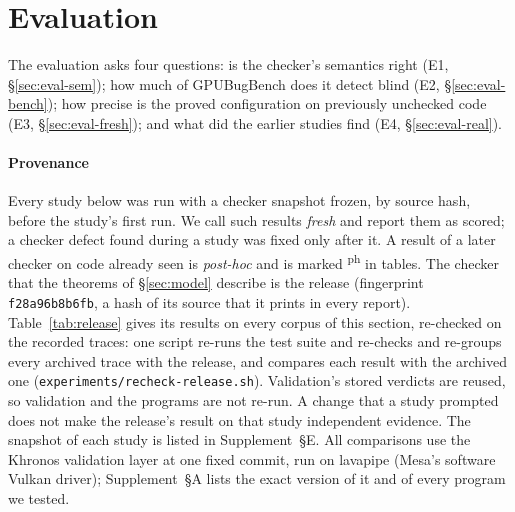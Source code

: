 \documentclass[acmtog,anonymous,review]{acmart}
\newcommand{\bench}{GPUBugBench\xspace}
\newcommand{\code}[1]{\texttt{#1}}
\newcommand{\supp}[1]{Supplement~\S#1}
\newcommand{\posthoc}{\textsuperscript{\textsf{ph}}}
\newcommand{\relhash}{\code{f28a96b8b6fb}}
\begin{document}
\section{Evaluation}
\label{sec:eval}

The evaluation asks four questions: is the checker's semantics right (E1, \S\ref{sec:eval-sem}); how much of \bench
does it detect blind (E2, \S\ref{sec:eval-bench}); how precise is the proved configuration on previously unchecked code
(E3, \S\ref{sec:eval-fresh}); and what did the earlier studies find (E4, \S\ref{sec:eval-real}).

\paragraph{Provenance}
Every study below was run with a checker snapshot frozen, by source hash, before the study's first run. We call such
results \emph{fresh} and report them as scored; a checker defect found during a study was fixed only after it. A result
of a later checker on code already seen is \emph{post-hoc} and is marked \posthoc{} in tables. The checker that the
theorems of \S\ref{sec:model} describe is the release (fingerprint \relhash, a hash of its source that it prints in every report). Table~\ref{tab:release}
gives its results on every corpus of this section, re-checked on the recorded traces: one script re-runs the test
suite and re-checks and re-groups every archived trace with the release, and compares each result with the archived
one (\code{experiments/recheck-release.sh}). Validation's stored verdicts are reused, so validation and the programs
are not re-run. A change that a study prompted does not make the release's result on that study independent
evidence. The snapshot of each study is
listed in \supp{E}. All comparisons use the Khronos validation layer at one fixed commit, run on lavapipe (Mesa's
software Vulkan driver); \supp{A} lists the exact version of it and of every program we tested.
\end{document}
